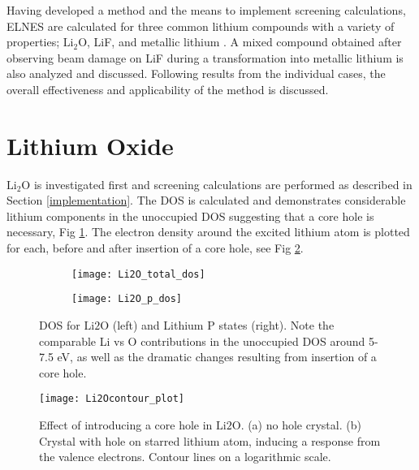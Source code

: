
Having developed a method and the means to implement screening calculations, ELNES are calculated for three common lithium compounds with a variety of properties; $\mathrm{Li_2O}$, LiF, and metallic lithium  .  A mixed compound obtained after observing beam damage on LiF during a transformation into metallic lithium is also analyzed and discussed.  Following results from the individual cases, the overall effectiveness and applicability of the method is discussed.




\section{Lithium Oxide}

 $ \mathrm{Li_2O} $ is investigated first and screening calculations are performed as described in Section \ref{implementation}. The DOS is calculated and demonstrates considerable lithium components in the unoccupied DOS suggesting that a core hole is necessary, Fig \ref{Li2O_dos}.   The electron density around the excited lithium atom is plotted for each, before and after insertion of a core hole, see Fig \ref{Li2O_contour}.  \\


\begin{figure}
	\centering
	\begin{subfigure}{0.45\textwidth}
		\texttt{[image: Li2O\_total\_dos]}
	\end{subfigure}
	\hspace{-0.01cm}
	\begin{subfigure}{0.45\textwidth}
		\texttt{[image: Li2O\_p\_dos]}
	\end{subfigure}
	
	\caption{DOS for $ \mathrm{Li2O} $ (left) and Lithium P states (right).  Note the comparable Li vs O contributions in the unoccupied DOS around 5-7.5 eV, as well as the dramatic changes resulting from insertion of a core hole.}
	\label{Li2O_dos}
\end{figure}

\begin{figure}
	\centering
	\texttt{[image: Li2Ocontour\_plot]}
	\caption{Effect of introducing a core hole in $ \mathrm{Li2O} $.  (a) no hole crystal.  (b) Crystal with hole on starred lithium atom, inducing a response from the valence electrons.  Contour lines on a logarithmic scale. }
	\label{Li2O_contour}
\end{figure}

